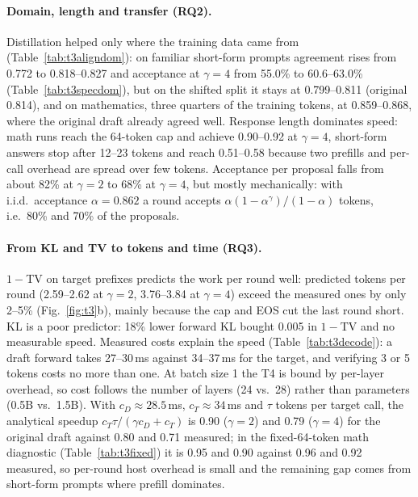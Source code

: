 \documentclass{article}
\begin{document}
\paragraph{Domain, length and transfer (RQ2).}
Distillation helped only where the training data came from (Table~\ref{tab:t3aligndom}): on familiar short-form prompts
agreement rises from 0.772 to 0.818--0.827 and acceptance at $\gamma=4$ from 55.0\% to 60.6--63.0\% (Table~\ref{tab:t3specdom}),
but on the shifted split it stays at 0.799--0.811 (original 0.814), and on mathematics, three quarters of the training
tokens, at 0.859--0.868, where the original draft already agreed well. Response length dominates speed: math runs reach
the 64-token cap and achieve 0.90--0.92 at $\gamma=4$, short-form answers stop after 12--23 tokens and reach 0.51--0.58
because two prefills and per-call overhead are spread over few tokens. Acceptance per proposal falls from about 82\% at
$\gamma=2$ to 68\% at $\gamma=4$, but mostly mechanically: with i.i.d.\ acceptance $\alpha=0.862$ a round accepts
$\alpha(1-\alpha^\gamma)/(1-\alpha)$ tokens, i.e.\ 80\% and 70\% of the proposals.

\paragraph{From KL and TV to tokens and time (RQ3).}
$1-$TV on target prefixes predicts the work per round well: predicted tokens per round (2.59--2.62 at $\gamma=2$,
3.76--3.84 at $\gamma=4$) exceed the measured ones by only 2--5\% (Fig.~\ref{fig:t3}b), mainly because the cap and EOS cut
the last round short. KL is a poor predictor: 18\% lower forward KL bought 0.005 in $1-$TV and no measurable speed. Measured
costs explain the speed (Table~\ref{tab:t3decode}): a draft forward takes 27--30\,ms against 34--37\,ms for the target,
and verifying 3 or 5 tokens costs no more than one. At batch size 1 the T4 is bound by per-layer overhead, so cost follows
the number of layers (24 vs.\ 28) rather than parameters (0.5B vs.\ 1.5B). With $c_D\approx28.5$\,ms, $c_T\approx34$\,ms
and $\tau$ tokens per target call, the analytical speedup $c_T\tau/(\gamma c_D+c_T)$ is 0.90 ($\gamma=2$) and 0.79
($\gamma=4$) for the original draft against 0.80 and 0.71 measured; in the fixed-64-token math diagnostic
(Table~\ref{tab:t3fixed}) it is 0.95 and 0.90 against 0.96 and 0.92 measured, so per-round host overhead is small and the
remaining gap comes from short-form prompts where prefill dominates.
\end{document}
